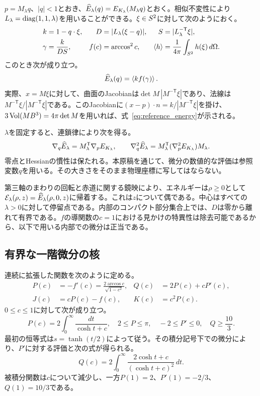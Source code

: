 $p=M_\lambda q$、$|q|<1$とおき、$\widehat E_\lambda(q)=E_{K_\lambda}(M_\lambda q)$とおく。相似不変性により$L_\lambda=\operatorname{diag}(1,1,\lambda)$を用いることができる。$\xi\in S^2$に対して次のようにおく。
\begin{align}
 k&=1-q\cdot\xi,& D&=|L_\lambda(\xi-q)|,& S&=|L_\lambda^{-\mathsf T}\xi|,\label{eq:reference_variables}\\
 \gamma&=\frac{k}{DS},& f(c)&=\arccos^2c,&
 \left\langle h\right\rangle&=\frac1{4\pi}\int_{S^2}h(\xi)\,d\Omega.\nonumber
\end{align}
このとき次が成り立つ。
\begin{equation}\label{eq:reference_energy}
 \widehat E_\lambda(q)=\left\langle kf(\gamma)\right\rangle.
\end{equation}
実際、$x=M\xi$に対して、曲面のJacobianは$\det M\,|M^{-\mathsf T}\xi|$であり、法線は$M^{-\mathsf T}\xi/|M^{-\mathsf T}\xi|$である。このJacobianに$(x-p)\cdot n=k/|M^{-\mathsf T}\xi|$を掛け、$3\operatorname{Vol}(MB^3)=4\pi\det M$を用いれば、式~\eqref{eq:reference_energy}が示される。

$\lambda$を固定すると、連鎖律により次を得る。
\begin{equation}\label{eq:coordinate_hessian}
 \nabla_q\widehat E_\lambda=M_\lambda^{\mathsf T}\nabla_pE_{K_\lambda},\qquad
 \nabla_q^2\widehat E_\lambda=M_\lambda^{\mathsf T}(\nabla_p^2E_{K_\lambda})M_\lambda.
\end{equation}
零点とHessianの慣性は保たれる。本原稿を通じて、微分の数値的な評価は参照変数$q$を用いる。その大きさをそのまま物理座標に写してはならない。

第三軸のまわりの回転と赤道に関する鏡映により、エネルギーは$\rho\ge0$として$\mathcal E_\lambda(\rho,z)=\widehat E_\lambda(\rho,0,z)$に帰着する。これは$z$について偶である。中心はすべての$\lambda>0$に対して停留点である。内部のコンパクト部分集合上では、$D$は零から離れて有界である。$f$の導関数の$c=1$における見かけの特異性は除去可能であるから、以下で用いる内部での微分は正当である。

\subsection{有界な一階微分の核}
連続に拡張した関数を次のように定める。
\begin{align}
 P(c)&=-f'(c)=\frac{2\arccos c}{\sqrt{1-c^2}},& Q(c)&=2P(c)+cP'(c),\label{eq:PQ}\\
 J(c)&=cP(c)-f(c),& K(c)&=c^2P(c).\nonumber
\end{align}
$0\le c\le1$に対して次が成り立つ。
\begin{equation}\label{eq:PQbounds}
 P(c)=2\int_0^\infty\frac{dt}{\cosh t+c},\quad
 2\le P\le\pi,\quad -2\le P'\le0,\quad Q\ge\frac{10}{3}.
\end{equation}
最初の恒等式は$s=\tanh(t/2)$によって従う。その積分記号下での微分により、$P'$に対する評価と次の式が得られる。
\[
 Q(c)=2\int_0^\infty\frac{2\cosh t+c}{(\cosh t+c)^2}\,dt.
\]
被積分関数は$c$について減少し、一方$P(1)=2$、$P'(1)=-2/3$、$Q(1)=10/3$である。

